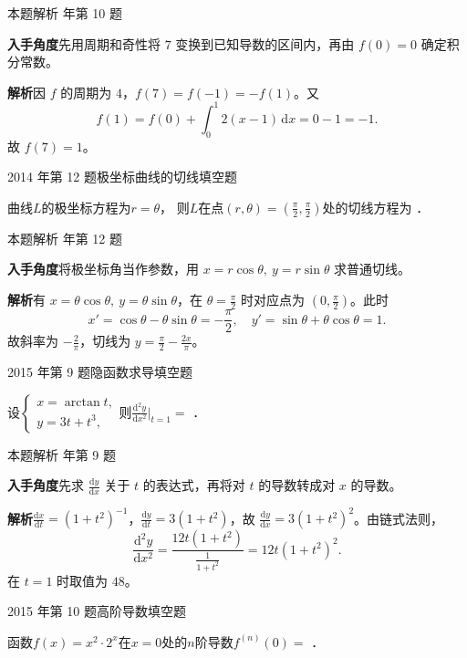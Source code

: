\documentclass[UTF8,zihao=-4,fontset=fandol]{ctexart}
\newcommand{\blank}{\underline{\hspace{5em}}}
\newcommand{\QuestionPage}[6]{%
  \par\noindent\begin{minipage}{\linewidth}
  \raggedright
  {\small\textcolor{black!60}{#3\quad #5}\hfill\textcolor{accent}{#2}}\par\smallskip}
\newcommand{\QuestionEnd}{\end{minipage}\par\medskip}
\newcommand{\QuestionPage}[6]{%
  \clearpage
  {\small\textcolor{accent}{#1\hfill #2}}\par\medskip
  {\small\textcolor{black!60}{#3\quad #5\hfill #6}}\par\vspace{9bp}}
\newcommand{\QuestionEnd}{}
\newenvironment{QuestionSolution}[1]{%
  \clearpage
  {\small\textcolor{black!60}{本题解析\quad #1}}\par\medskip
}{\par\clearpage}
\begin{document}
\begin{QuestionSolution}{2014 年第 10 题}
\textbf{入手角度}\quad 先用周期和奇性将 \(7\) 变换到已知导数的区间内，再由 \(f(0)=0\) 确定积分常数。

\textbf{解析}\quad 因 \(f\) 的周期为 \(4\)，\(f(7)=f(-1)=-f(1)\)。又
\[
f(1)=f(0)+\int_0^1 2(x-1)\,\mathrm{d}x=0-1=-1.
\]
故 \(\boxed{f(7)=1}\)。
\end{QuestionSolution}

\QuestionPage{2.2 求导的基本法则}{填空题}{2014 年第 12 题}{2}{极坐标曲线的切线}{069 / 234}
曲线$L$的极坐标方程为$r = \theta$，
则$L$在点$(r,\theta) = \left(\frac{\pi}{2},\frac{\pi}{2}\right)$处的切线方程为 \blank{}．
\QuestionEnd

\begin{QuestionSolution}{2014 年第 12 题}
\textbf{入手角度}\quad 将极坐标角当作参数，用 \(x=r\cos\theta,\ y=r\sin\theta\) 求普通切线。

\textbf{解析}\quad 有 \(x=\theta\cos\theta,\ y=\theta\sin\theta\)，在 \(\theta=\frac{\pi}{2}\) 时对应点为 \((0,\frac{\pi}{2})\)。此时
\[
x'=\cos\theta-\theta\sin\theta=-\frac{\pi}{2},\quad
y'=\sin\theta+\theta\cos\theta=1.
\]
故斜率为 \(-\frac{2}{\pi}\)，切线为 \(\boxed{y=\frac{\pi}{2}-\frac{2x}{\pi}}\)。
\end{QuestionSolution}

\QuestionPage{2.2 求导的基本法则}{填空题}{2015 年第 9 题}{2}{隐函数求导}{070 / 234}
设$\begin{cases}
  x = \arctan t, \\
  y = 3t + t^3,
\end{cases}$则$\frac{\mathrm{d}^2y}{\mathrm{d} x^2}\big|_{t = 1} =$ \blank{}．
\QuestionEnd

\begin{QuestionSolution}{2015 年第 9 题}
\textbf{入手角度}\quad 先求 \(\frac{\mathrm{d}y}{\mathrm{d}x}\) 关于 \(t\) 的表达式，再将对 \(t\) 的导数转成对 \(x\) 的导数。

\textbf{解析}\quad \(\frac{\mathrm{d}x}{\mathrm{d}t}=(1+t^2)^{-1}\)，\(\frac{\mathrm{d}y}{\mathrm{d}t}=3(1+t^2)\)，故 \(\frac{\mathrm{d}y}{\mathrm{d}x}=3(1+t^2)^2\)。由链式法则，
\[
\frac{\mathrm{d}^2y}{\mathrm{d}x^2}
=\frac{12t(1+t^2)}{\frac{1}{1+t^2}}
=12t(1+t^2)^2.
\]
在 \(t=1\) 时取值为 \(\boxed{48}\)。
\end{QuestionSolution}

\QuestionPage{2.2 求导的基本法则}{填空题}{2015 年第 10 题}{2}{高阶导数}{071 / 234}
函数$f(x) = x^2 \cdot 2^x$在$x = 0$处的$n$阶导数$f^{(n)}(0) =$ \blank{}．
\QuestionEnd
\end{document}
